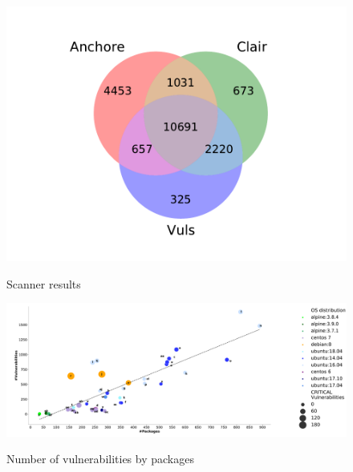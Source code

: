 \documentclass[a4paper,num-refs]{oup-contemporary}
\begin{document}
\begin{figure}
        {\includegraphics[scale=2.5,width=\columnwidth]
        {Figures/venn.pdf}}
        \caption{\label{fig:venn} Scanner results}
\end{figure}

\begin{figure}[t]
	{\includegraphics[scale=1.5,width=\textwidth]
	{Figures/vulngraph.pdf}}
        \caption{\label{fig:graph1} Number of vulnerabilities by packages}
      \end{figure}
\end{document}
